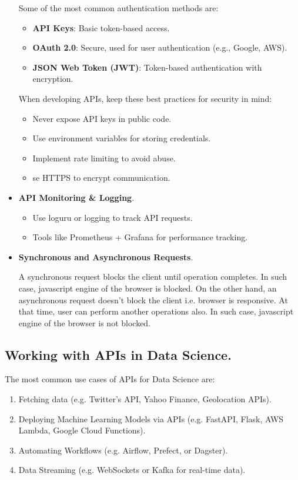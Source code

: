 \begin{itemize}
    Some of the most common authentication methods are:
    \begin{itemize}
        \item \textbf{API Keys}: Basic token-based access.
        \item \textbf{OAuth 2.0}: Secure, used for user authentication
        (e.g., Google, AWS).
        \item \textbf{JSON Web Token (JWT)}: Token-based authentication
        with encryption.
    \end{itemize}
    When developing APIs, keep these best practices for security in 
    mind:
    \begin{itemize}
        \item Never expose API keys in public code.
        \item Use environment variables for storing credentials.
        \item Implement rate limiting to avoid abuse.
        \item se HTTPS to encrypt communication.
    \end{itemize}

    \item \textbf{API Monitoring & Logging}.
    \begin{itemize}
        \item Use loguru or logging to track API requests.
        \item Tools like Prometheus + Grafana for performance tracking.
    \end{itemize}

    \item \textbf{Synchronous and Asynchronous Requests}.

    A synchronous request blocks the client until operation completes.
    In such case, javascript engine of the browser is blocked. On the
    other hand, an asynchronous request doesn't block the client i.e.
    browser is responsive. At that time, user can perform another
    operations also. In such case, javascript engine of the browser
    is not blocked.
\end{itemize}



\subsection{Working with APIs in Data Science.}
The most  common use  cases of APIs for Data Science are:
\begin{enumerate}
    \item Fetching data
    (e.g. Twitter's API, Yahoo Finance, Geolocation APIs).
    \item Deploying Machine Learning Models via APIs
    (e.g. FastAPI, Flask, AWS Lambda, Google Cloud Functions).
    \item Automating Workflows
    (e.g. Airflow, Prefect, or Dagster).
    \item Data Streaming
    (e.g. WebSockets or Kafka for real-time data).
\end{enumerate}
